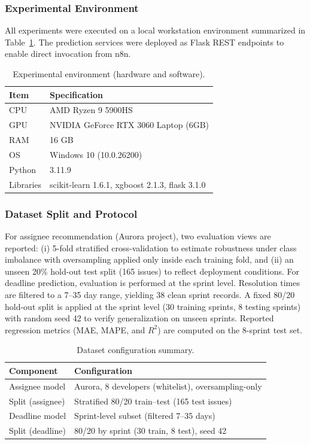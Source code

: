 \documentclass[conference]{IEEEtran}
\begin{document}
\subsubsection{Experimental Environment}
All experiments were executed on a local workstation environment summarized in Table~\ref{tab:exp_env}. The prediction services were deployed as Flask REST endpoints to enable direct invocation from n8n.

\begin{table}[t]
\centering
\caption{Experimental environment (hardware and software).}
\renewcommand{\arraystretch}{1.1}
\begin{tabular}{l l}
\hline
\textbf{Item} & \textbf{Specification} \\
\hline
CPU & AMD Ryzen 9 5900HS \\
GPU & NVIDIA GeForce RTX 3060 Laptop (6GB) \\
RAM & 16 GB \\
OS & Windows 10 (10.0.26200) \\
Python & 3.11.9 \\
Libraries & scikit-learn 1.6.1, xgboost 2.1.3, flask 3.1.0 \\
\hline
\end{tabular}
\label{tab:exp_env}
\end{table}

\subsubsection{Dataset Split and Protocol}
For assignee recommendation (Aurora project), two evaluation views are reported: (i) 5-fold stratified cross-validation to estimate robustness under class imbalance with oversampling applied only inside each training fold, and (ii) an unseen 20\% hold-out test split (165 issues) to reflect deployment conditions. For deadline prediction, evaluation is performed at the sprint level. Resolution times are filtered to a 7--35 day range, yielding 38 clean sprint records. A fixed 80/20 hold-out split is applied at the sprint level (30 training sprints, 8 testing sprints) with random seed 42 to verify generalization on unseen sprints. Reported regression metrics (MAE, MAPE, and $R^2$) are computed on the 8-sprint test set.


\begin{table}[t]
\centering
\caption{Dataset configuration summary.}
\renewcommand{\arraystretch}{1.1}
\begin{tabular}{l l}
\hline
\textbf{Component} & \textbf{Configuration} \\
\hline
Assignee model & Aurora, 8 developers (whitelist), oversampling-only \\
Split (assignee) & Stratified 80/20 train--test (165 test issues) \\
Deadline model & Sprint-level subset (filtered 7--35 days) \\
Split (deadline) & 80/20 by sprint (30 train, 8 test), seed 42 \\
\hline
\end{tabular}
\label{tab:data_cfg}
\end{table}
\end{document}
